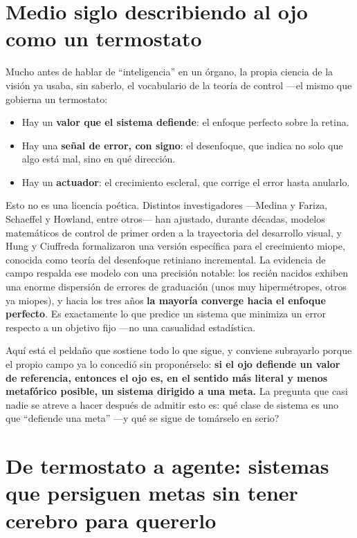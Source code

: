 \documentclass[10pt,a4paper]{article}
\providecommand{\enquote}[1]{``#1''}
\begin{document}
\section{Medio siglo describiendo al ojo como un termostato}

Mucho antes de hablar de \enquote{inteligencia} en un \'organo, la propia ciencia de la visi\'on ya usaba, sin saberlo, el vocabulario de la teor\'ia de control ---el mismo que gobierna un termostato:

\begin{itemize}[leftmargin=1.3em,itemsep=2pt,topsep=4pt]
  \item Hay un \textbf{valor que el sistema defiende}: el enfoque perfecto sobre la retina.
  \item Hay una \textbf{se\~nal de error, con signo}: el desenfoque, que indica no solo que algo est\'a mal, sino en qu\'e direcci\'on.
  \item Hay un \textbf{actuador}: el crecimiento escleral, que corrige el error hasta anularlo.
\end{itemize}

Esto no es una licencia po\'etica. Distintos investigadores ---Medina y Fariza, Schaeffel y Howland, entre otros--- han ajustado, durante d\'ecadas, modelos matem\'aticos de control de primer orden a la trayectoria del desarrollo visual, y Hung y Ciuffreda formalizaron una versi\'on espec\'ifica para el crecimiento miope, conocida como teor\'ia del desenfoque retiniano incremental. La evidencia de campo respalda ese modelo con una precisi\'on notable: los reci\'en nacidos exhiben una enorme dispersi\'on de errores de graduaci\'on (unos muy hiperm\'etropes, otros ya miopes), y hacia los tres a\~nos \textbf{la mayor\'ia converge hacia el enfoque perfecto}. Es exactamente lo que predice un sistema que minimiza un error respecto a un objetivo fijo ---no una casualidad estad\'istica.

Aqu\'i est\'a el pelda\~no que sostiene todo lo que sigue, y conviene subrayarlo porque el propio campo ya lo concedi\'o sin proponérselo: \textbf{si el ojo defiende un valor de referencia, entonces el ojo es, en el sentido m\'as literal y menos metaf\'orico posible, un sistema dirigido a una meta.} La pregunta que casi nadie se atreve a hacer despu\'es de admitir esto es: \textquestiondown qu\'e clase de sistema es uno que \enquote{defiende una meta} ---y qu\'e se sigue de tom\'arselo en serio?

\section{De termostato a agente: sistemas que persiguen metas sin tener cerebro para quererlo}
\end{document}

